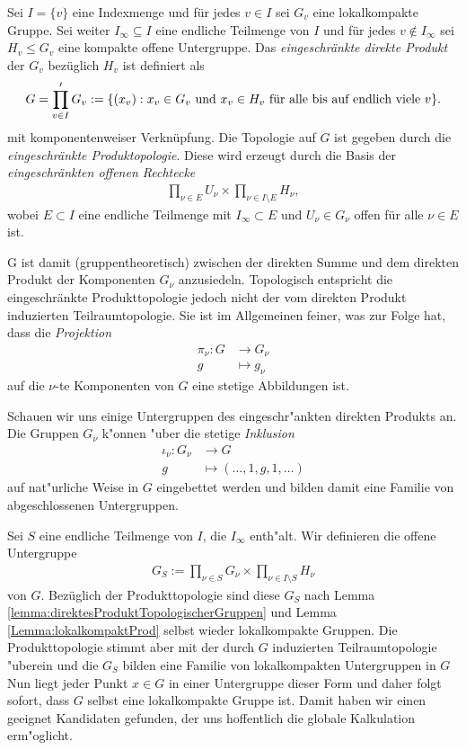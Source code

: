 		\begin{defi}
			Sei $I=\{v\}$ eine Indexmenge und für jedes $v \in I$ sei $G_v$ eine lokalkompakte Gruppe. 
			Sei weiter $I_\infty \subseteq I$ eine endliche Teilmenge von $I$ und für jedes $v \notin I_\infty$ sei $H_v\leq G_v$ eine kompakte offene Untergruppe. 
			Das \emph{eingeschränkte direkte Produkt} der $G_v$ bezüglich $H_v$ ist definiert als 
			\begin{align*}
				G = \prod\limits_{v \in I}' G_v := \{ (x_v): x_v \in G_v \text{ und } x_v \in H_v \text{ für alle bis auf endlich viele } v \}.
			\end{align*}
			mit komponentenweiser Verknüpfung. Die Topologie auf $G$ ist gegeben durch die \emph{eingeschränkte Produktopologie}. 
			Diese wird erzeugt durch die Basis der \emph{eingeschränkten offenen Rechtecke}
			\begin{align*}
				\prod_{\nu\in E} U_\nu \times \prod_{\nu\in I\setminus E} H_\nu,
			\end{align*}
			wobei $E \subset I$ eine endliche Teilmenge mit $I_\infty \subset E$ und $U_\nu \in G_\nu$ offen für alle $\nu\in E$ ist.
		\end{defi}
		G ist damit (gruppentheoretisch) zwischen der direkten Summe und dem direkten Produkt der Komponenten $G_\nu$ anzusiedeln.
		Topologisch entspricht die eingeschränkte Produkttopologie jedoch nicht der vom direkten Produkt induzierten Teilraumtopologie.
		Sie ist im Allgemeinen feiner, was zur Folge hat, dass die \emph{Projektion}
		\begin{align*}
			\pi_\nu: G &\to G_\nu\\
					g&\mapsto g_\nu
		\end{align*}
		auf die $\nu$-te Komponenten von $G$ eine stetige Abbildungen ist.
		
		Schauen wir uns einige Untergruppen des eingeschr"ankten direkten Produkts an.
		Die Gruppen $G_\nu$ k"onnen "uber die stetige \emph{Inklusion} 
		\begin{align*}
			\iota_\nu: G_\nu &\to G \\
					g &\mapsto (\dots,1,g,1,\dots)
		\end{align*}
		auf nat"urliche Weise in $G$ eingebettet werden und bilden damit eine Familie von abgeschlossenen Untergruppen.
		
		Sei $S$ eine endliche Teilmenge von $I$, die $I_\infty$ enth"alt. 
		Wir definieren die offene Untergruppe
		\begin{align*}
			G_S := \prod_{\nu\in S}G_\nu \times \prod_{\nu\in I\setminus S} H_\nu
		\end{align*}
		von $G$. 
		Bezüglich der Produkttopologie sind diese $G_S$ nach Lemma \ref{lemma:direktesProduktTopologischerGruppen} und Lemma \ref{Lemma:lokalkompaktProd} selbst wieder lokalkompakte Gruppen.
		Die Produkttopologie stimmt aber mit der durch $G$ induzierten Teilraumtopologie "uberein und die $G_S$ bilden eine Familie von lokalkompakten Untergruppen in $G$
		Nun liegt jeder Punkt $x \in G$ in einer Untergruppe dieser Form und daher folgt sofort, dass $G$ selbst eine lokalkompakte Gruppe ist.
		Damit haben wir einen geeignet Kandidaten gefunden, der uns hoffentlich die globale Kalkulation erm"oglicht.
		
